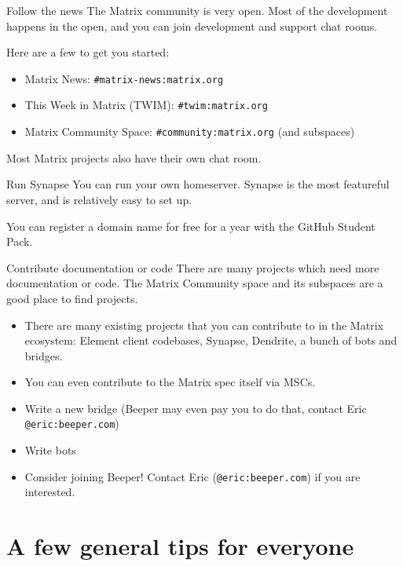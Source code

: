\documentclass{acm}
\begin{document}
\begin{frame}{Follow the news}
    The Matrix community is very open. Most of the development happens in the
    open, and you can join development and support chat rooms.

    Here are a few to get you started:
    \begin{itemize}
        \item Matrix News: \texttt{\#matrix-news:matrix.org}
        \item This Week in Matrix (TWIM): \texttt{\#twim:matrix.org}
        \item Matrix Community Space: \texttt{\#community:matrix.org} (and
            subspaces)
    \end{itemize}

    Most Matrix projects also have their own chat room.
\end{frame}

\begin{frame}{Run Synapse}
    You can run your own homeserver. Synapse is the most featureful server, and
    is relatively easy to set up.

    You can register a domain name for free for a year with the GitHub Student
    Pack.
\end{frame}

\begin{frame}{Contribute documentation or code}
    There are many projects which need more documentation or code. The Matrix
    Community space and its subspaces are a good place to find projects.
    \begin{itemize}[<+->]
        \item There are many existing projects that you can contribute to in the
            Matrix ecosystem: Element client codebases, Synapse, Dendrite, a
            bunch of bots and bridges.
        \item You can even contribute to the Matrix spec itself via MSCs.
        \item Write a new bridge (Beeper may even pay you to do that, contact
            Eric \texttt{@eric:beeper.com})
        \item Write bots
        \item Consider joining Beeper! Contact Eric (\texttt{@eric:beeper.com})
            if you are interested.
    \end{itemize}
\end{frame}

\section{A few general tips for everyone}
\end{document}
